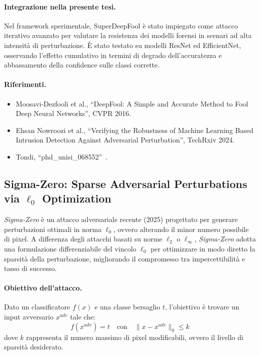 \paragraph{Integrazione nella presente tesi.}
Nel framework sperimentale, SuperDeepFool è stato impiegato come attacco iterativo avanzato per valutare la resistenza dei modelli forensi in scenari ad alta intensità di perturbazione. È stato testato su modelli ResNet ed EfficientNet, osservando l’effetto cumulativo in termini di degrado dell’accuratezza e abbassamento della confidence sulle classi corrette.

\paragraph{Riferimenti.}
\begin{itemize}
    \item Moosavi-Dezfooli et al., “DeepFool: A Simple and Accurate Method to Fool Deep Neural Networks”, CVPR 2016.
    \item Ehsan Nowroozi et al., “Verifying the Robustness of Machine Learning Based Intrusion Detection Against Adversarial Perturbation”, TechRxiv 2024.
    \item Tondi, “phd\_unisi\_068552”~\cite{phd_unisi_068552}.
\end{itemize}





\subsection{Sigma-Zero: Sparse Adversarial Perturbations via \texorpdfstring{$\ell_0$}{l0} Optimization}
\label{sec:sigma_zero}

\textit{Sigma-Zero} è un attacco adversariale recente (2025) progettato per generare perturbazioni ottimali in norma $\ell_0$, ovvero alterando il minor numero possibile di pixel. A differenza degli attacchi basati su norme $\ell_2$ o $\ell_\infty$, \textit{Sigma-Zero} adotta una formulazione differenziabile del vincolo $\ell_0$ per ottimizzare in modo diretto la sparsità della perturbazione, migliorando il compromesso tra impercettibilità e tasso di successo.

\paragraph{Obiettivo dell’attacco.}
Dato un classificatore $f(x)$ e una classe bersaglio $t$, l’obiettivo è trovare un input avversario $x^{adv}$ tale che:
\[
f(x^{adv}) = t \quad \text{con} \quad \|x - x^{adv}\|_0 \leq k
\]
dove $k$ rappresenta il numero massimo di pixel modificabili, ovvero il livello di sparsità desiderato.

